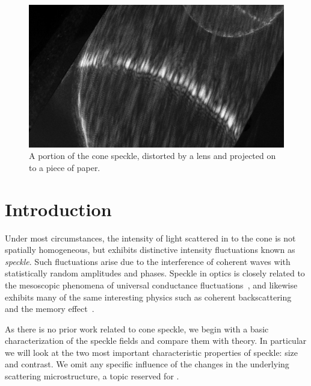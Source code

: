 \begin{figure}[ht]
\centering
\includegraphics[keepaspectratio,width=15cm]{speckle/figures/Ag_LaSFN9_cone_lens11_cam-8899.jpg}
\caption{A portion of the cone speckle, distorted by a lens and projected on to a piece of paper.}
\label{fig:examplespeckle}
\end{figure}
\section{Introduction}
Under most circumstances, the intensity of light scattered in to the cone
is not spatially homogeneous, but exhibits distinctive intensity
fluctuations known as \textit{speckle}.  Such fluctuations arise due to the
interference of coherent waves with statistically random amplitudes and
phases.  Speckle in optics is closely related to the mesoscopic phenomena
of universal conductance fluctuations~\cite{lee1985universal}, and likewise
exhibits many of the same interesting physics such as coherent
backscattering~\cite{akkermans1986coherent} and the memory
effect~\cite{freund1988memory}.

As there is no prior work related to cone speckle, we begin with a basic
characterization of the speckle fields and compare them with theory.  In
particular we will look at the two most important characteristic properties
of speckle: size and contrast.  We omit any specific influence of the
changes in the underlying scattering microstructure, a topic reserved for
.  
